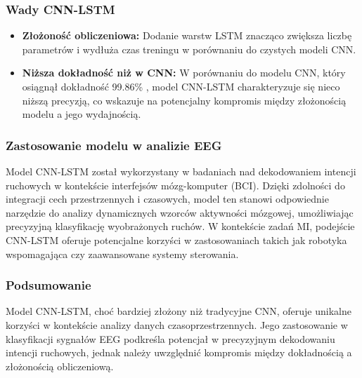 \documentclass[eeg_v4.tex]{subfiles}
\begin{document}
    \subsubsection{Wady CNN-LSTM}
    \begin{itemize}
        \item \textbf{Złożoność obliczeniowa:}
        Dodanie warstw LSTM znacząco zwiększa liczbę parametrów i wydłuża czas treningu w porównaniu do czystych modeli
        CNN.
        \item \textbf{Niższa dokładność niż w CNN:} W porównaniu do modelu CNN, który osiągnął dokładność 99.86\%
        , model CNN-LSTM charakteryzuje się nieco niższą precyzją, co wskazuje na potencjalny kompromis między
        złożonością modelu a jego wydajnością.
    \end{itemize}

    \subsubsection{Zastosowanie modelu w analizie EEG}
    Model CNN-LSTM został wykorzystany w badaniach nad dekodowaniem intencji ruchowych w kontekście interfejsów
    mózg-komputer (BCI). Dzięki zdolności do integracji cech przestrzennych i czasowych, model ten stanowi odpowiednie
    narzędzie do analizy dynamicznych wzorców aktywności mózgowej, umożliwiając precyzyjną klasyfikację wyobrażonych
    ruchów. W kontekście zadań MI, podejście CNN-LSTM oferuje potencjalne korzyści w zastosowaniach takich jak robotyka
    wspomagająca czy zaawansowane systemy sterowania.

    \subsubsection{Podsumowanie}
    Model CNN-LSTM, choć bardziej złożony niż tradycyjne CNN, oferuje unikalne korzyści w kontekście analizy danych
    czasoprzestrzennych. Jego zastosowanie w klasyfikacji sygnałów EEG podkreśla potencjał w precyzyjnym dekodowaniu
    intencji ruchowych, jednak należy uwzględnić kompromis między dokładnością a złożonością obliczeniową.
\end{document}
